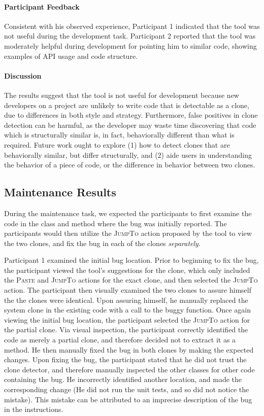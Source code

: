 \documentclass[nocopyrightspace,10pt]{sigplanconf}
\begin{document}
\paragraph{Participant Feedback}
Consistent with his observed experience, Participant 1 indicated that
the tool was not useful during the development task. Participant 2
reported that the tool was moderately helpful during development for
pointing him to similar code, showing examples of API usage and code
structure.

\paragraph{Discussion}
The results suggest that the tool is not useful for development
because new developers on a project are unlikely to write code that is
detectable as a clone, due to differences in both style and
strategy. Furthermore, false positives in clone detection can be harmful, as the developer may
waste time discovering that code which is structurally similar is, in fact, behaviorally
different than what is required. Future work ought to explore (1) how
to detect clones that are behaviorally similar, but differ
structurally, and (2) aide users in understanding the behavior of a
piece of code, or the difference in behavior between two clones.

\subsection{Maintenance Results}
During the maintenance task, we expected the participants to first
examine the code in the class and method where the bug was initially
reported. The participants would then utilize the \textsc{JumpTo}
action proposed by the tool to view the two clones, and fix the bug in
each of the clones \textit{separately}.

Participant 1 examined the initial bug location. Prior to beginning to
fix the bug, the participant viewed the tool's suggestions for the
clone, which only included the \textsc{Paste} and \textsc{JumpTo}
actions for the exact clone, and then selected the \textsc{JumpTo}
action. The participant then visually examined the two clones to
assure himself the the clones were identical. Upon assuring himself,
he manually replaced the system clone in the existing code with a call
to the buggy function. Once again viewing the initial bug location,
the participant selected the \textsc{JumpTo} action for the partial
clone. Via visual inspection, the participant correctly identified the
code as merely a partial clone, and therefore decided not to extract
it as a method. He then manually fixed the bug in both clones by
making the expected changes. Upon fixing the bug, the participant
stated that he did not trust the clone detector, and therefore
manually inspected the other classes for other code containing the
bug. He incorrectly identified another location, and made the
corresponding change (He did not run the unit tests,
and so did not notice the mistake). This mistake can be attributed 
to an imprecise description of the bug in the instructions. 
\end{document}
